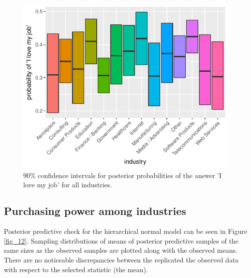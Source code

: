 \documentclass{article}
\begin{document}
\begin{figure}[H]
\centering
\includegraphics{report-038}
\caption{90\% confidence intervals for posterior probabilities of the answer 'I love my job' for all industries.}\label{fig_11}
\end{figure}

\subsection{Purchasing power among industries}


Posterior predictive check for the hierarchical normal model can be seen in Figure \ref{fig_12}. Sampling distributions of means of posterior predictive samples of the same sizes as the observed samples are plotted along with the observed means. There are no noticeable discrepancies between the replicated the observed data with respect to the selected statistic (the mean).
\end{document}

